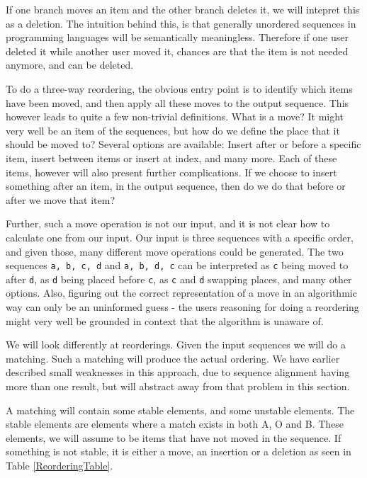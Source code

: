 \documentclass[11pt]{article}
\begin{document}
If one branch moves an item and the other branch deletes it, we will intepret this as a deletion. The intuition behind this, is that generally unordered sequences in programming languages will be semantically meaningless. Therefore if one user deleted it while another user moved it, chances are that the item is not needed anymore, and can be deleted.

To do a three-way reordering, the obvious entry point is to identify which items have been moved, and then apply all these moves to the output sequence. This however leads to quite a few non-trivial definitions. What is a move? It might very well be an item of the sequences, but how do we define the place that it should be moved to? Several options are available: Insert after or before a specific item, insert between items or insert at index, and many more. Each of these items, however will also present further complications. If we choose to insert something after an item, in the output sequence, then do we do that before or after we move that item?

Further, such a move operation is not our input, and it is not clear how to calculate one from our input. Our input is three sequences with a specific order, and given those, many different move operations could be generated. The two sequences \texttt{a, b, c, d} and \texttt{a, b, d, c} can be interpreted as \texttt{c} being moved to after \texttt{d}, as \texttt{d} being placed before \texttt{c}, as \texttt{c} and \texttt{d} swapping places, and many other options. Also, figuring out the correct representation of a move in an algorithmic way can only be an uninformed guess - the users reasoning for doing a reordering might very well be grounded in context that the algorithm is unaware of.

We will look differently at reorderings. Given the input sequences we will do a matching. Such a matching will produce the actual ordering. We have earlier described small weaknesses in this approach, due to sequence alignment having more than one result, but will abstract away from that problem in this section.

A matching will contain some stable elements, and some unstable elements. The stable elements are elements where a match exists in both A, O and B. These elements, we will assume to be items that have not moved in the sequence. If something is not stable, it is either a move, an insertion or a deletion as seen in Table \ref{ReorderingTable}.
\end{document}
